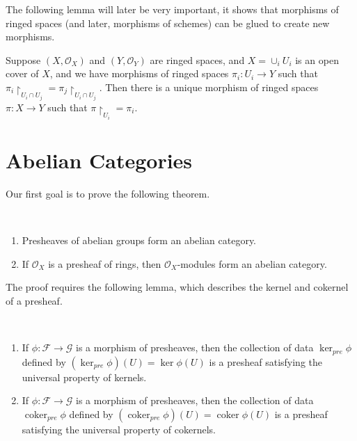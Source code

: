 \documentclass[11pt,openany]{book} %
\newcommand{\coker}{\operatorname{coker}}
\begin{document}
The following lemma will later be very important, it shows that morphisms of ringed spaces (and later, morphisms of schemes) can be glued to create new morphisms.\\

\begin{lemma} \label{gluersmor}
Suppose $(X, \mathcal{O}_X)$ and $(Y, \mathcal{O}_Y)$ are ringed spaces, and $X = \cup_i U_i$ is an open cover of $X$, and we have morphisms of ringed spaces $\pi_i : U_i \to Y$ such that $\pi_i\restriction_{U_i \cap U_j} = \pi_j\restriction_{U_i \cap U_j}$. Then there is a unique morphism of ringed spaces $\pi : X \to Y$ such that $\pi\restriction_{U_i} = \pi_i$.
\end{lemma}


\section{Abelian Categories}

Our first goal is to prove the following theorem.\\

\begin{theorem}\ \label{abl1}
\begin{enumerate}[label=$\blacktriangleright$]
	\item Presheaves of abelian groups form an abelian category.
    \item If $\mathcal{O}_X$ is a presheaf of rings, then $\mathcal{O}_X$-modules form an abelian category.
\end{enumerate}
\end{theorem}
\hfill

The proof requires the following lemma, which describes the kernel and cokernel of a presheaf.\\

\begin{lemma}\
\begin{enumerate}[label=$\blacktriangleright$]
	\item If $\phi : \mathcal{F} \to \mathcal{G}$ is a morphism of presheaves, then the collection of data $\ker_{pre} \phi$ defined by $(\ker_{pre} \phi)(U) = \ker \phi(U)$ is a presheaf satisfying the universal property of kernels.
	\item If $\phi : \mathcal{F} \to \mathcal{G}$ is a morphism of presheaves, then the collection of data $\coker_{pre} \phi$ defined by $(\coker_{pre} \phi)(U) = \coker \phi(U)$ is a presheaf satisfying the universal property of cokernels.
\end{enumerate}
\end{lemma}
\medskip
\end{document}
